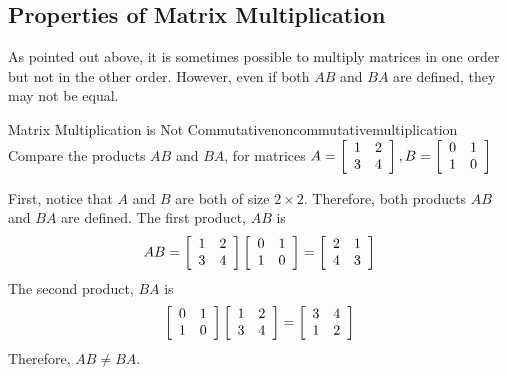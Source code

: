 \subsection{Properties of Matrix Multiplication}

As pointed out above, it is sometimes possible
to multiply matrices in one order
but not in the other order. However, even if both $AB$ and $BA$ are defined,
they may not be equal. 

\begin{example}{Matrix Multiplication is Not Commutative}{noncommutativemultiplication}
Compare the products $AB$ and $BA$, for matrices $ A = \left[
\begin{array}{rr}
1 & 2 \\
3 & 4
\end{array}
\right], B= \left[
\begin{array}{rr}
0 & 1 \\
1 & 0
\end{array}
\right] $ 
\end{example}

\begin{solution} 
First, notice that $A$ and $B$ are both of size $2 \times 2$. Therefore, both 
products $AB$ and $BA$ are defined. 
The first product, $AB$ is
\begin{equation*}
AB = \left[
\begin{array}{rr}
1 & 2 \\
3 & 4
\end{array}
\right] \left[
\begin{array}{rr}
0 & 1 \\
1 & 0
\end{array}
\right] = \left[
\begin{array}{rr}
2 & 1 \\
4 & 3
\end{array}
\right] 
\end{equation*}
The second product, $BA$ is
\begin{equation*}
\left[
\begin{array}{rr}
0 & 1 \\
1 & 0
\end{array}
\right] \left[
\begin{array}{rr}
1 & 2 \\
3 & 4
\end{array}
\right] = \left[
\begin{array}{rr}
3 & 4 \\
1 & 2
\end{array}
\right] 
\end{equation*}
Therefore, $AB \neq BA$. 
\end{solution}

